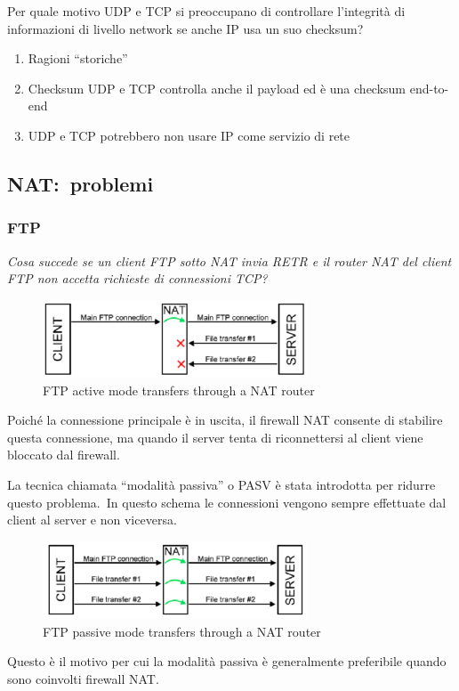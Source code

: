 Per quale motivo UDP e TCP si preoccupano di controllare l’integrità di informazioni di livello network se anche IP usa un suo checksum?

\begin{enumerate}
    \item Ragioni ``storiche''
    \item Checksum UDP e TCP controlla anche il payload ed è una checksum end-to-end
    \item UDP e TCP potrebbero non usare IP come servizio di rete
\end{enumerate}

\subsection{NAT:\ problemi}

\subsubsection{FTP}

\emph{Cosa succede se un client FTP sotto NAT invia RETR e il router NAT del client FTP non accetta richieste di connessioni TCP?}
\begin{figure}[H]
    \centering
    \includegraphics[width=0.7\textwidth]{immagini/FTPactive_NAT.png}
    \caption*{FTP active mode transfers through a NAT router}
\end{figure}

Poiché la connessione principale è in uscita, il firewall NAT consente di stabilire questa connessione, ma quando il server tenta di riconnettersi al client viene bloccato dal firewall.

La tecnica chiamata ``modalità passiva'' o PASV è stata introdotta per ridurre questo problema.\
In questo schema le connessioni vengono sempre effettuate dal client al server e non viceversa.

\begin{figure}[H]
    \centering
    \includegraphics[width=0.7\textwidth]{immagini/FTPpassive_NAT.png}
    \caption*{FTP passive mode transfers through a NAT router}

\end{figure}
Questo è il motivo per cui la modalità passiva è generalmente preferibile quando sono coinvolti firewall NAT.

